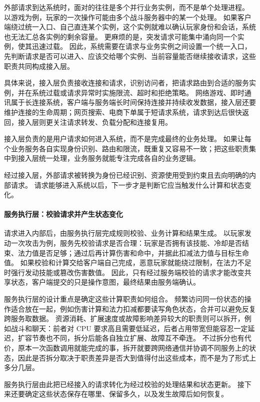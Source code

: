 外部请求到达系统时，面对的往往是多个并行业务实例，而不是单个处理进程。
以游戏为例，玩家的一次操作可能由多个战斗服务器中的某一个处理。
如果客户端绕过统一入口、自己直连某个实例，这个实例就难以确认玩家身份和会话，系统也无法汇总各实例的剩余容量。
更麻烦的是，突发请求可能集中涌向同一个实例，使其迅速过载。
因此，系统需要在请求与业务实例之间设置一个统一入口，先判断请求是否可以进入、应该交给哪个实例、当前容量能否继续接收请求，这些职责共同构成接入层。

具体来说，接入层负责接收连接和请求，识别访问者，把请求路由到合适的服务实例，并在系统过载或请求异常时实施限流、超时和拒绝策略。
网络游戏、即时通讯属于长连接系统，客户端与服务端长时间保持连接并持续收发数据，接入层还要维护连接的生命周期；网页搜索、电商下单属于短请求系统，请求到达后很快返回，接入层则更关注请求转发、负载分配和连接复用。

接入层负责的是用户请求如何进入系统，而不是完成最终的业务处理。
如果让每个业务服务各自实现身份识别、路由和限流，既重复又容易不一致；把这些职责集中到接入层统一处理，业务服务就能专注完成各自的业务逻辑。

经过接入层，外部请求被转换为身份已经识别、资源使用受到约束且去向明确的内部请求。
请求能够进入系统以后，下一步才是判断它应当触发什么计算和状态变化。

\paragraph{服务执行层：校验请求并产生状态变化}

请求进入内部后，由服务执行层完成规则校验、业务计算和结果生成。
以玩家发动一次攻击为例，服务先校验请求是否合理：玩家是否拥有该技能、冷却是否结束、法力值是否足够；通过后再计算伤害和命中，并据此扣减法力值与目标生命值。
如果校验和计算交给客户端自己完成，恶意玩家就能绕过限制，在法力不足时强行发动技能或篡改伤害数值。
因此，只有经过服务端校验的请求才能改变共享状态，客户端提交的只是操作意图，最终结果由服务端确认。

服务执行层的设计重点是确定这些计算职责如何组合。
频繁访问同一份状态的操作适合放在一起，例如伤害计算和法力扣减都要读写角色状态，合并可以避免反复跨服务取数据。
资源消耗、扩展速度或故障影响差异较大的职责则可以拆开，例如战斗和聊天：前者对 CPU 要求高且需要低延迟，后者占用带宽但能容忍一定延迟，扩容节奏也不同，拆分后能各自独立扩展、故障互不牵连。
不过拆分也有代价，原本一次函数调用就能完成的事，拆开就要跨网络通信并协调不同服务上的状态，因此是否拆分取决于职责差异是否大到值得付出这些成本，而不是为了形式上多分几层。

服务执行层由此把已经接入的请求转化为经过校验的处理结果和状态更新。
接下来还要确定这些状态保存在哪里、保留多久，以及发生故障后如何恢复。

